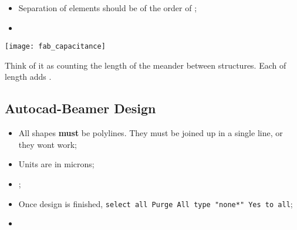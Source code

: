 \begin{framed}\noindent
  \begin{itemize}
  \item Separation of elements should be of the order of ;
  \item {}\ec
  \end{itemize}

   \begin{center}
     \texttt{[image: fab\_capacitance]}
     
     {\small Think  of it  as counting  the length  of the  meander between  structures.  Each
        of length adds .\label{fig:example-image-c}}
   \end{center}
 \end{framed}


 \subsection{Autocad-Beamer Design}
 \label{sec:autocad-design}

 \begin{itemize}
 \item All shapes \textbf{must} be polylines. They must be joined up in a single line, or they
   wont work;
 \item Units are in microns;
 \item {}\ec;
 \item Once design is finished, \texttt{select all \ra  Purge \ra All \ra type "none*" \ra Yes
     to all};

 \item {}\ec
 \end{itemize}

